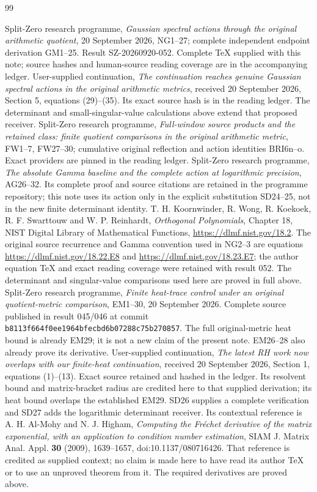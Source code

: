 \documentclass[11pt]{article}
\begin{document}
\clearpage
\begin{thebibliography}{99}

 Split-Zero research programme, \emph{Gaussian spectral
actions through the original arithmetic quotient}, 20 September 2026,
NG1--27; complete independent endpoint derivation GM1--25. Result
SZ-20260920-052. Complete TeX supplied with this note; source hashes and
human-source reading coverage are in the accompanying ledger.
 User-supplied continuation, \emph{The continuation
reaches genuine Gaussian spectral actions in the original arithmetic
metrics}, received 20 September 2026, Section 5, equations (29)--(35).
Its exact source hash is in the reading ledger. The determinant and
small-singular-value calculations above extend that proposed receiver.
 Split-Zero research programme, \emph{Full-window source
products and the retained class: finite quotient comparisons in the
original arithmetic metric}, FW1--7, FW27--30; cumulative original
reflection and action identities BRI6n--o. Exact providers are pinned
in the reading ledger.
 Split-Zero research programme, \emph{The absolute Gamma
baseline and the complete action at logarithmic precision}, AG26--32.
Its complete proof and source citations are retained in the programme
repository; this note uses its action only in the explicit substitution
SD24--25, not in the new finite determinant identity.
 T. H. Koornwinder, R. Wong, R. Koekoek,
R. F. Swarttouw and W. P. Reinhardt, \emph{Orthogonal Polynomials},
Chapter 18, NIST Digital Library of Mathematical Functions,
\url{https://dlmf.nist.gov/18.2}. The original source recurrence and
Gamma convention used in NG2--3 are equations
\url{https://dlmf.nist.gov/18.22.E8} and
\url{https://dlmf.nist.gov/18.23.E7}; the author equation TeX and exact
reading coverage were retained with result 052. The determinant and
singular-value comparisons used here are proved in full above.
 Split-Zero research programme, \emph{Finite heat-trace
control under an original quotient-metric comparison}, EM1--30,
20 September 2026. Complete source published in result 045/046 at
commit \nolinkurl{b8113f664f0ee1964bfecbd6b07288c75b270857}.
The full original-metric heat bound is already EM29; it is not a new
claim of the present note. EM26--28 also already prove its derivative.
 User-supplied continuation, \emph{The latest RH
work now overlaps with our finite-heat continuation}, received
20 September 2026, Section 1, equations (1)--(13). Exact source retained
and hashed in the ledger. Its resolvent bound and matrix-bracket radius
are credited here to that supplied derivation; its heat bound overlaps
the established EM29. SD26 supplies a complete verification and SD27 adds the logarithmic
determinant receiver. Its contextual reference is A. H. Al-Mohy and
N. J. Higham, \emph{Computing the Fr\'echet derivative of the matrix
exponential, with an application to condition number estimation},
SIAM J. Matrix Anal. Appl. \textbf{30} (2009), 1639--1657,
doi:10.1137/080716426. That reference is credited as supplied context;
no claim is made here to have read its author TeX or to use an unproved
theorem from it. The required derivatives are proved above.



\end{thebibliography}
\end{document}
